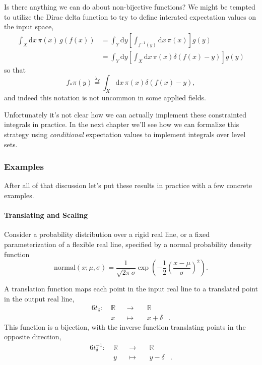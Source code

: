 \documentclass[
  letterpaper,
  DIV=11,
  numbers=noendperiod]{scrartcl}
\let\oldparagraph\paragraph
\renewcommand{\paragraph}[1]{\oldparagraph{#1}\mbox{}}
\begin{document}
Is there anything we can do about non-bijective functions? We might be
tempted to utilize the Dirac delta function to try to define interated
expectation values on the input space, \begin{align*}
\int_{X} \mathrm{d} x \, \pi(x) \, g(f(x))
&=
\int_{Y} \mathrm{d} y
\left[ \int_{f^{-1}(y)} \mathrm{d} x \, \pi(x) \right] g(y)
\\
&=
\int_{Y} \mathrm{d} y
\left[ \int_{X} \mathrm{d} x \, \pi(x) \delta( f(x) - y ) \right] g(y)
\end{align*} so that \[
f_{*} \pi(y) \overset{\lambda_{Y}}{=}
\int_{X} \mathrm{d} x \, \pi(x) \delta( f(x) - y ),
\] and indeed this notation is not uncommon in some applied fields.

Unfortunately it's not clear how we can actually implement these
constrainted integrals in practice. In the next chapter we'll see how we
can formalize this strategy using \emph{conditional} expectation values
to implement integrals over level sets.

\hypertarget{examples}{%
\subsubsection{Examples}\label{examples}}

After all of that discussion let's put these results in practice with a
few concrete examples.

\hypertarget{translating-and-scaling}{%
\paragraph{Translating and Scaling}\label{translating-and-scaling}}

Consider a probability distribution over a rigid real line, or a fixed
parameterization of a flexible real line, specified by a normal
probability density function \[
\mathrm{normal}(x; \mu, \sigma)
=
\frac{1}{\sqrt{2 \pi} \sigma}
\exp \left(
-\frac{1}{2} \left( \frac{ x - \mu}{\sigma} \right)^{2}
\right).
\]

A translation function maps each point in the input real line to a
translated point in the output real line, \begin{alignat*}{6}
t_{\delta} :\; & \mathbb{R} & &\rightarrow& \; & \mathbb{R} &
\\
& x & &\mapsto& & x + \delta &.
\end{alignat*} This function is a bijection, with the inverse function
translating points in the opposite direction, \begin{alignat*}{6}
t_{\delta}^{-1} :\; & \mathbb{R} & &\rightarrow& \; & \mathbb{R} &
\\
& y & &\mapsto& & y - \delta &.
\end{alignat*}
\end{document}
